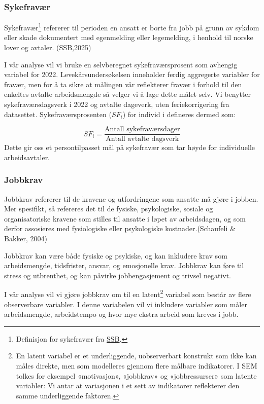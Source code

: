 \documentclass[
  12pt,
  a4paper,
  DIV=11,
  numbers=noendperiod]{scrartcl}
\begin{document}
\subsubsection{Sykefravær}\label{sykefravuxe6r}

Sykefravær\footnote{Definisjon for sykefravær fra
  \href{https://www.ssb.no/arbeid-og-lonn/arbeidsmiljo-sykefravaer-og-arbeidskonflikter/statistikk/sykefravaer}{SSB}.}
refererer til perioden en ansatt er borte fra jobb på grunn av sykdom
eller skade dokumentert med egenmelding eller legemelding, i henhold til
norske lover og avtaler. (SSB,2025)

I vår analyse vil vi bruke en selvberegnet sykefraværsprosent som
avhengig variabel for 2022. Levekårsundersøkelsen inneholder ferdig
aggregerte variabler for fravær, men for å ta sikre at målingen vår
reflekterer fravær i forhold til den enkeltes avtalte arbeidsmengde så
velger vi å lage dette målet selv. Vi benytter sykefraværsdagsverk i
2022 og avtalte dageverk, uten feriekorrigering fra datasettet.
Sykefraværsprosenten (\(SF_i\)) for individ i defineres dermed som:

\[
SF_i = \frac{ \text{Antall sykefraværsdager}}{\text{Antall avtalte dagsverk}} 
\] Dette gir oss et persontilpasset mål på sykefravær som tar høyde for
individuelle arbeidsavtaler.

\subsubsection{Jobbkrav}\label{jobbkrav}

Jobbkrav refererer til de kravene og utfordringene som ansatte må gjøre
i jobben. Mer spesifikt, så refereres det til de fysiske, psykologiske,
sosiale og organisatoriske kravene som stilles til ansatte i løpet av
arbeidsdagen, og som derfor assosieres med fysiologiske eller
psykologiske kostnader.(Schaufeli \& Bakker, 2004)

Jobbkrav kan være både fysiske og psykiske, og kan inkludere krav som
arbeidsmengde, tidsfrister, ansvar, og emosjonelle krav. Jobbkrav kan
føre til stress og utbrenthet, og kan påvirke jobbengasjement og trivsel
negativt.

I vår analyse vil vi gjøre jobbkrav om til en latent\footnote{En latent
  variabel er et underliggende, uobserverbart konstrukt som ikke kan
  måles direkte, men som modelleres gjennom flere målbare indikatorer. I
  SEM tolkes for eksempel «motivasjon», «jobbkrav» og «jobbressurser»
  som latente variabler: Vi antar at variasjonen i et sett av
  indikatorer reflekterer den samme underliggende faktoren.} variabel
som består av flere observerbare variabler. I denne variabelen vil vi
inkludere variabler som måler arbeidsmengde, arbeidstempo og hvor mye
ekstra arbeid som kreves i jobb.
\end{document}
